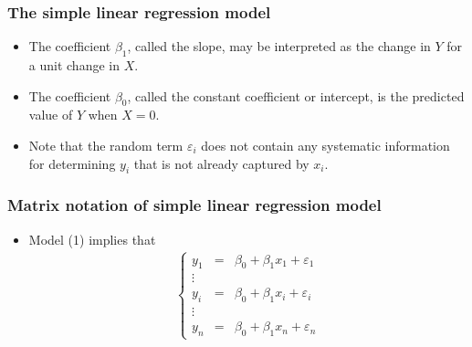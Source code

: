 \documentclass{beamer}
\begin{document}
\begin{frame}\frametitle{The simple linear regression model}
\begin{itemize}
\item The coefficient $\beta_1$, called the slope, may be interpreted as the change in $Y$ for a unit change in $X$.
\item The coefficient $\beta_0$, called the constant coefficient or intercept, is the predicted value of $Y$ when $X=0$.
\item Note that the random term $\varepsilon_i$ does not contain any systematic information for determining $y_i$ that is not already captured by $x_i$.
\end{itemize}
\end{frame}


\begin{frame}\frametitle{Matrix notation of simple linear regression model}
\begin{itemize}
\item Model (1) implies that
\begin{eqnarray}
\left\{ \begin{array}{ccl}
y_1& =& \beta_0 + \beta_1 x_1 +  \varepsilon_1\\
\vdots \\
y_i& =& \beta_0 + \beta_1 x_i + \varepsilon_i\\
\vdots \\
y_n& =& \beta_0 + \beta_1 x_n + \varepsilon_n
\end{array} \right.
\end{eqnarray}
\end{itemize}
\end{frame}
\end{document}
